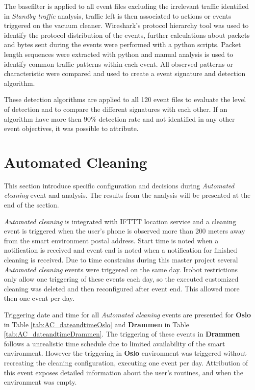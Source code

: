  The basefilter is applied to all event files excluding the irrelevant traffic identified in \textit{Standby traffic} analysis, traffic left is then associated to actions or events triggered on the vacuum cleaner. Wireshark's protocol hierarchy tool was used to identify the protocol distribution of the events, further calculations about packets and bytes sent during the events were performed with a python scripts. Packet length sequences were extracted with python and manual analysis is used to identify common traffic patterns within each event. All observed patterns or characteristic were compared and used to create a event signature and detection algorithm. 

 These detection algorithms are applied to all 120 event files to evaluate the level of detection and to compare the different signatures with each other. If an algorithm have more then 90\% detection rate and not identified in any other event objectives, it was possible to attribute.

 \section{Automated Cleaning}

This section introduce specific configuration and decisions during \textit{Automated cleaning} event and analysis. The results from the analysis will be presented at the end of the section. 
 
\textit{Automated cleaning} is integrated with IFTTT location service and a cleaning event is triggered when the user's phone is observed more than 200 meters away from the smart environment postal address. Start time is noted when a notification is received and event end is noted when a notification for finished cleaning is received. Due to time constrains during this master project several \textit{Automated cleaning} events were triggered on the same day. Irobot restrictions only allow one triggering of these events each day, so the executed customized cleaning was deleted and then reconfigured after event end. This allowed more then one event per day.

Triggering date and time for all \textit{Automated cleaning} events are presented for \textbf{Oslo} in Table \ref{tab:AC_dateandtimeOslo} and \textbf{Drammen} in Table \ref{tab:AC_dateandtimeDrammen}. The triggering of these events in \textbf{Drammen} follows a unrealistic time schedule due to limited availability of the smart environment. However the triggering in \textbf{Oslo} environment was triggered without recreating the cleaning configuration, executing one event per day. Attribution of this event exposes detailed information about the user's routines, and when the environment was empty. 

